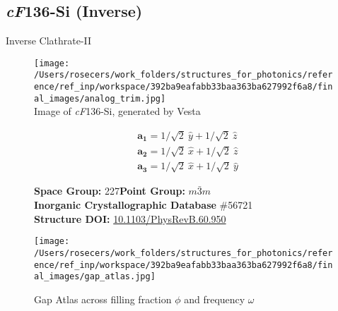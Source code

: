 \subsection{\large{\textit{cF}136-Si (Inverse)}}\vspace{-0.1in}
Inverse Clathrate-II


\begin{figure}[H]
\begin{minipage}{0.34\textwidth}\centering
\texttt{[image: /Users/rosecers/work\_folders/structures\_for\_photonics/reference/ref\_inp/workspace/392ba9eafabb33baa363ba627992f6a8/final\_images/analog\_trim.jpg]}\\
\small{Image of \textit{cF}136-Si, generated by Vesta}
\end{minipage}\hfill
\begin{minipage}{0.65\textwidth}\raggedright
{\setlength{\mathindent}{0cm}
\begin{equation*}
\begin{split}&\boldsymbol{a_1} = 1/\sqrt{2}\ \hat{y} + 1/\sqrt{2}\ \hat{z}\\[-8pt]
&\boldsymbol{a_2} = 1/\sqrt{2}\ \hat{x} + 1/\sqrt{2}\ \hat{z}\\[-8pt]
&\boldsymbol{a_3} = 1/\sqrt{2}\ \hat{x} + 1/\sqrt{2}\ \hat{y}
\end{split}
\end{equation*}}

\textbf{Space Group:}	227\hspace{0.5in}\textbf{Point Group:}	$m\bar{3}m$\\
\textbf{Inorganic Crystallographic Database} \#56721\\
\textbf{Structure DOI: }\url{10.1103/PhysRevB.60.950}

\end{minipage}\hfill
\end{figure}
\vspace{-0.25in}


\begin{figure}[H]
\begin{minipage}{0.9\textwidth}\centering
\texttt{[image: /Users/rosecers/work\_folders/structures\_for\_photonics/reference/ref\_inp/workspace/392ba9eafabb33baa363ba627992f6a8/final\_images/gap\_atlas.jpg]}
\\
\end{minipage}\hfill\caption{Gap Atlas across filling fraction $\phi$ and frequency $\omega$}
\end{figure}


